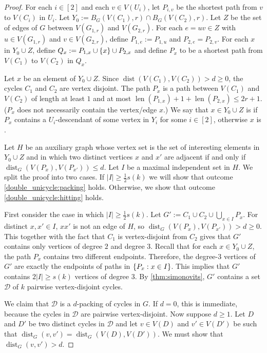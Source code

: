 \documentclass{patmorin}
\DeclareMathOperator{\len}{len}
\DeclareMathOperator{\dist}{dist}
\DeclarePairedDelimiter\set{\{}{\}}
\renewcommand{\mid}{:}  %
\begin{document}
\begin{proof}
  For each $i\in[2]$ and each $v\in V(U_i)$, let $P_{i,v}$ be the shortest path from $v$ to $V(C_i)$ in $U_i$. Let $Y_0:=B_G(V(C_1),r)\cap B_G(V(C_2),r)$. Let $Z$ be the set of edges of $G$ between $V(G_{1,r})$ and $V(G_{2,r})$. For each $e=uv\in Z$ with $u\in V(G_{1,r})$ and $v\in V(G_{2,r})$, define $P_{1,e}:=P_{1,u}$ and $P_{2,e}=P_{2,v}$. For each $x$ in $Y_0\cup Z$, define $Q_x:=P_{1,x}\cup\set{x}\cup P_{2,x}$ and define $P_x$ to be a shortest path from $V(C_1)$ to $V(C_2)$ in $Q_x$.

  Let $x$ be an element of $Y_0\cup Z$.  Since $\dist(V(C_1),V(C_2))>d\ge 0$, the cycles $C_1$ and $C_2$ are vertex disjoint.  The path $P_x$ is a path between $V(C_1)$ and $V(C_2)$ of length at least $1$ and at most $\len(P_{1,x})+1+\len(P_{2,x})\le 2r+1$.  ($P_x$ does not necessarily contain the vertex/edge $x$.) We say that $x\in Y_0\cup Z$ is  if $P_x$ contains a $U_i$-descendant of some vertex in $Y_i$ for some $i\in[2]$,  otherwise $x$ is .

  Let $H$ be an auxiliary graph whose vertex set is the set of interesting elements in $Y_0\cup Z$ and in which two distinct vertices $x$ and $x'$ are adjacent if and only if $\dist_G(V(P_x),V(P_{x'}))\leq d$. Let $I$ be a maximal independent set in $H$. We split the proof into two cases.  If $|I|\geq \frac{1}{2}s(k)$ we will show that outcome \cref{double_unicycle:packing} holds.  Otherwise, we show that outcome \cref{double_unicycle:hitting} holds.

  First consider the case in which $|I|\ge\tfrac{1}{2}s(k)$. Let $G':=C_1\cup C_2\cup\bigcup_{x\in I}P_x$. For distinct $x,x'\in I$, $xx'$ is not an edge of $H$, so $\dist_G(V(P_x),V(P_{x'}))>d\ge 0$. This together with the fact that $C_1$ is vertex-disjoint from $C_2$ gives that $G'$ contains only vertices of degree $2$ and degree $3$. Recall that for each $x\in Y_0\cup Z$, the path $P_x$ contains two different endpoints. Therefore, the degree-$3$ vertices of $G'$ are exactly the endpoints of paths in $\set{P_x\mid x\in I}$. This implies that $G'$ contains $2|I|\geq s(k)$ vertices of degree $3$. By \cref{thm:simonovits}, $G'$ contains a set $\mathcal{D}$ of $k$ pairwise vertex-disjoint cycles.

  We claim that $\mathcal{D}$ is a $d$-packing of cycles in $G$. If $d=0$, this is immediate, because the cycles in $\mathcal{D}$ are pairwise vertex-disjoint.  Now suppose $d\ge 1$. Let $D$ and $D'$ be two distinct cycles in $\mathcal{D}$ and let $v\in V(D)$ and $v'\in V(D')$ be such that $\dist_G(v,v')=\dist_G(V(D),V(D'))$.  We must show that $\dist_G(v,v')>d$.


\end{proof}
\end{document}
